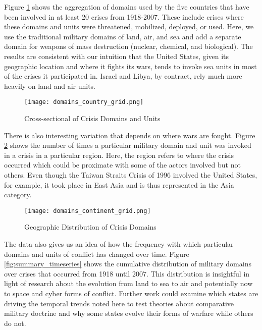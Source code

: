 \documentclass[12pt,letterpaper]{article}
\begin{document}
		Figure \ref{fig:summary_crosssec} shows the aggregation of domains used by the five countries that have been involved in at least 20 crises from 1918-2007. These include crises where these domains and units were threatened, mobilized, deployed, or used. Here, we use the traditional military domains of land, air, and sea and add a separate domain for weapons of mass destruction (nuclear, chemical, and biological). The results are consistent with our intuition that the United States, given its geographic location and where it fights its wars, tends to invoke sea units in most of the crises it participated in. Israel and Libya, by contract, rely much more heavily on land and air units.
		
		\begin{figure}[H]
			\centering
			\texttt{[image: domains\_country\_grid.png]}
			\caption{Cross-sectional of Crisis Domains and Units}
			\label{fig:summary_crosssec}
		\end{figure}
		
		There is also interesting variation that depends on where wars are fought. Figure \ref{fig:summary_region} shows the number of times a particular military domain and unit was invoked in a crisis in a particular region. Here, the region refers to where the crisis occurred which could be proximate with some of the actors involved but not others. Even though the Taiwan Straits Crisis of 1996 involved the United States, for example, it took place in East Asia and is thus represented in the Asia category.
		
		\begin{figure}[H]
			\centering
			\texttt{[image: domains\_continent\_grid.png]}
			\caption{Geographic Distribution of Crisis Domains}
			\label{fig:summary_region}
		\end{figure}
		
		The data also gives us an idea of how the frequency with which particular domains and units of conflict has changed over time. Figure \ref{fig:summary_timeseries} shows the cumulative distribution of military domains over crises that occurred from 1918 until 2007. This distribution is insightful in light of research about the evolution from land to sea to air and potentially now to space and cyber forms of conflict. Further work could examine which states are driving the temporal trends noted here to test theories about comparative military doctrine and why some states evolve their forms of warfare while others do not.
		
\end{document}
